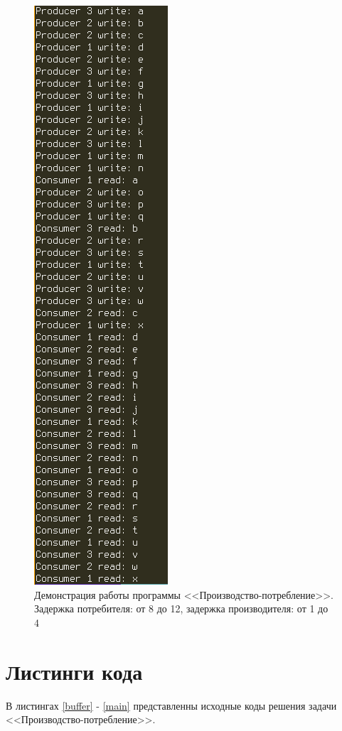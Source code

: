 \documentclass[12pt]{report}
\begin{document}
\begin{figure}[H]
	\centering
	\includegraphics[scale=0.75]{img/prod-cons-06.png}
	\caption{Демонстрация работы программы <<Производство-потребление>>. Задержка потребителя: от 8 до 12, задержка производителя: от 1 до 4}
	\label{fig:task01-06}
\end{figure}


\section{Листинги кода}

В листингах \ref{buffer} - \ref{main} представленны исходные коды решения задачи <<Производство-потребление>>.
\end{document}
